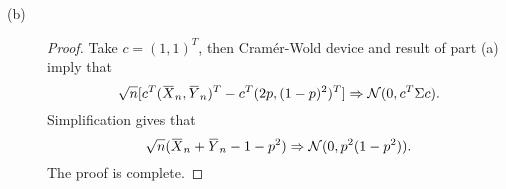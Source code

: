 \documentclass{article}
\newcommand{\eps}{\varepsilon}
\newcommand{\overbar}[1]{\mkern 1.5mu\overline{\mkern-1.5mu#1\mkern-1.5mu}\mkern 1.5mu}
\newcommand{\gaussian}{\mathcal{N}}
\theoremstyle{definition}
\theoremstyle{plain}
\theoremstyle{remark}
\begin{document}
\begin{description}
\begin{description}
\item[(b)]
\begin{proof}
Take $c = (1, 1)^T$, then Cram\'{e}r-Wold device and result of part (a) imply that
\begin{equation*}
\sqrt{n}[c^T(\overbar{X}_n, \overbar{Y}_n)^T - c^T (2p, (1 - p)^2)^T] \Rightarrow \gaussian(0, c^T\Sigma c).
\end{equation*}
Simplification gives that
\begin{equation*}
\sqrt{n}(\overbar{X}_n + \overbar{Y}_n - 1 - p^2) \Rightarrow \gaussian(0, p^2(1 - p^2)).
\end{equation*}
The proof is complete.
\end{proof}
\end{description}

\begin{comment}
\item[4.19]
\begin{description}
\item[(a)]
\begin{proof}
By construction, 
\begin{align*}
& \frac{n - t_n}{\sqrt{n}} = \frac{n - \ell_n(k_n + m)}{\sqrt{n}} \\
= & \frac{1}{\sqrt{n}}\left(n - \left\lfloor \frac{n}{k_n + m} \right\rfloor(k_n + m)\right) \\
= & \frac{1}{\sqrt{n}}\left(n - \left(\frac{n}{k_n + m} - \alpha_n\right)(k_n + m)\right) \\
= & \frac{\alpha_n(k_n + m)}{\sqrt{n}} \\
\leq & \frac{k_n + m}{\sqrt{n}} \to 0
\end{align*}
as $n \to \infty$. In above, $\alpha_n = \ell_n - \lfloor \ell_n \rfloor \in [0, 1)$ denotes the fraction part of $\ell_n$. 

Given $\eps > 0$, by Markov's inequality and stationarity of $\{X_i\}$, it follows that
\begin{align*}
& P\left[\left|\frac{1}{\sqrt{n}}\sum_{i = t_n + 1}^n X_i \right| \geq \eps\right] \\
\leq & \frac{1}{\sqrt{n}\eps} E\left[\left|\sum_{i = t_n + 1}^n X_i\right|\right] \\
\leq & \frac{n - t_n}{\sqrt{n}\eps} E[|X_1|] \to 0
\end{align*}
as $n \to \infty$. Hence $\dfrac{1}{\sqrt{n}}\sum\limits_{i = t_n + 1}^n X_i \to_P 0$.
\end{proof}


\end{comment}
\end{description}
\end{document}
